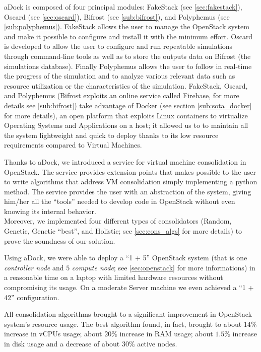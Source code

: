 aDock is composed of four principal modules: FakeStack (see \ref{sec:fakestack}), Oscard (see \ref{sec:oscard}), Bifrost (see \ref{sub:bifrost}), and Polyphemus (see \ref{sub:polyphemus}).
FakeStack allows the user to manage the OpenStack system and make it possible to configure and install it with the minimum effort. Oscard is developed to allow the user to configure and run repeatable simulations through command-line tools as well as to store the outputs data on Bifrost (the simulations database).
Finally Polyphemus allows the user to follow in real-time the progress of the simulation and to analyze various relevant data such as resource utilization or the characteristics of the simulation.
FakeStack, Oscard, and Polyphemus (Bifrost exploits an online service called Firebase, for more details see \ref{sub:bifrost}) take advantage of Docker (see section \ref{sub:sota_docker} for more details), an open platform that exploits Linux containers to virtualize Operating Systems and Applications on a host; it allowed us to to maintain all the system lightweight and quick to deploy thanks to its low resource requirements compared to Virtual Machines.

Thanks to aDock, we introduced a service for virtual machine consolidation in OpenStack. The service provides extension points that makes possible to the user to write algorithms that address VM consolidation simply implementing a python method. The service provides the user with an abstraction of the system, giving him/her all the ``tools'' needed to develop code in OpenStack without even knowing its internal behavior.\\
Moreover, we implemented four different types of consolidators (Random, Genetic, Genetic ``best'', and Holistic; see \ref{sec:cons_algs} for more details) to prove the soundness of our solution.

Using aDock, we were able to deploy a ``1 + 5'' OpenStack system (that is one \textit{controller node} and $5$ \textit{compute node}; see \ref{sec:openstack} for more informations) in a reasonable time on a laptop with limited hardware resources without compromising its usage. On a moderate Server machine we even achieved a ``1 + 42'' configuration.

All consolidation algorithms brought to a significant improvement in OpenStack system's resource usage. The best algorithm found, in fact, brought to about $14\%$ increase in vCPUs usage; about $20\%$ increase in RAM usage; about $1.5\%$ increase in disk usage and a decrease of about $30\%$ active nodes.

